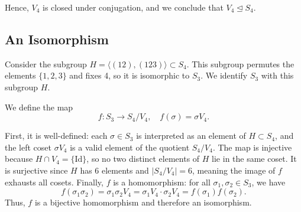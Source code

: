 \documentclass[12pt]{article}
\begin{document}
Hence, \( V_4 \) is closed under conjugation, and we conclude that \( V_4 \trianglelefteq S_4 \).

\subsection*{An Isomorphism}
Consider the subgroup \( H = \langle (12), (123) \rangle \subset S_4 \). This subgroup permutes the elements \( \{1, 2, 3\} \) and fixes 4, so it is isomorphic to \( S_3 \). We identify \( S_3 \) with this subgroup \( H \).

\medskip

We define the map
\[
f : S_3 \to S_4 / V_4, \quad f(\sigma) = \sigma V_4.
\]

First, it is well-defined: each \( \sigma \in S_3 \) is interpreted as an element of \( H \subset S_4 \), and the left coset \( \sigma V_4 \) is a valid element of the quotient \( S_4 / V_4 \). The map is injective because \( H \cap V_4 = \{ \text{Id} \} \), so no two distinct elements of \( H \) lie in the same coset. It is surjective since \( H \) has 6 elements and \( |S_4 / V_4| = 6 \), meaning the image of \( f \) exhausts all cosets. Finally, \( f \) is a homomorphism: for all \( \sigma_1, \sigma_2 \in S_3 \), we have
\[
f(\sigma_1 \sigma_2) = \sigma_1 \sigma_2 V_4 = \sigma_1 V_4 \cdot \sigma_2 V_4 = f(\sigma_1) f(\sigma_2).
\]
Thus, \( f \) is a bijective homomorphism and therefore an isomorphism.
\end{document}
